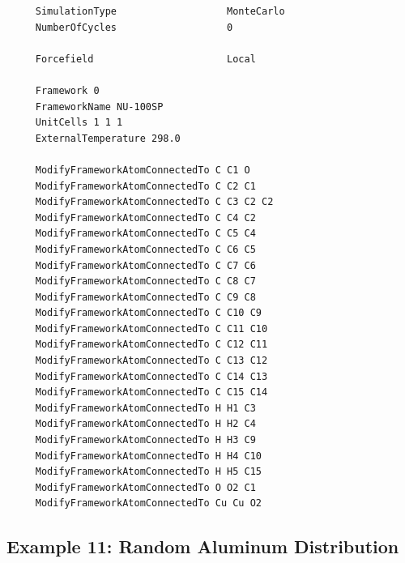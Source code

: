 \begin{tiny}
\begin{verbatim}
     SimulationType                   MonteCarlo
     NumberOfCycles                   0

     Forcefield                       Local

     Framework 0
     FrameworkName NU-100SP
     UnitCells 1 1 1
     ExternalTemperature 298.0

     ModifyFrameworkAtomConnectedTo C C1 O
     ModifyFrameworkAtomConnectedTo C C2 C1
     ModifyFrameworkAtomConnectedTo C C3 C2 C2
     ModifyFrameworkAtomConnectedTo C C4 C2
     ModifyFrameworkAtomConnectedTo C C5 C4
     ModifyFrameworkAtomConnectedTo C C6 C5
     ModifyFrameworkAtomConnectedTo C C7 C6
     ModifyFrameworkAtomConnectedTo C C8 C7
     ModifyFrameworkAtomConnectedTo C C9 C8
     ModifyFrameworkAtomConnectedTo C C10 C9
     ModifyFrameworkAtomConnectedTo C C11 C10
     ModifyFrameworkAtomConnectedTo C C12 C11
     ModifyFrameworkAtomConnectedTo C C13 C12
     ModifyFrameworkAtomConnectedTo C C14 C13
     ModifyFrameworkAtomConnectedTo C C15 C14
     ModifyFrameworkAtomConnectedTo H H1 C3
     ModifyFrameworkAtomConnectedTo H H2 C4
     ModifyFrameworkAtomConnectedTo H H3 C9
     ModifyFrameworkAtomConnectedTo H H4 C10
     ModifyFrameworkAtomConnectedTo H H5 C15
     ModifyFrameworkAtomConnectedTo O O2 C1
     ModifyFrameworkAtomConnectedTo Cu Cu O2
\end{verbatim}
\end{tiny}

\subsection*{Example 11: Random Aluminum Distribution}

